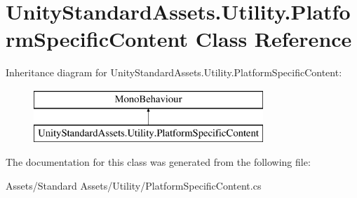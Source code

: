 \hypertarget{class_unity_standard_assets_1_1_utility_1_1_platform_specific_content}{}\section{Unity\+Standard\+Assets.\+Utility.\+Platform\+Specific\+Content Class Reference}
\label{class_unity_standard_assets_1_1_utility_1_1_platform_specific_content}
Inheritance diagram for Unity\+Standard\+Assets.\+Utility.\+Platform\+Specific\+Content\+:\begin{figure}[H]
\begin{center}
\leavevmode
\includegraphics[height=2.000000cm]{class_unity_standard_assets_1_1_utility_1_1_platform_specific_content}
\end{center}
\end{figure}


The documentation for this class was generated from the following file\+:\begin{DoxyCompactItemize}
\item 
Assets/\+Standard Assets/\+Utility/Platform\+Specific\+Content.\+cs\end{DoxyCompactItemize}
